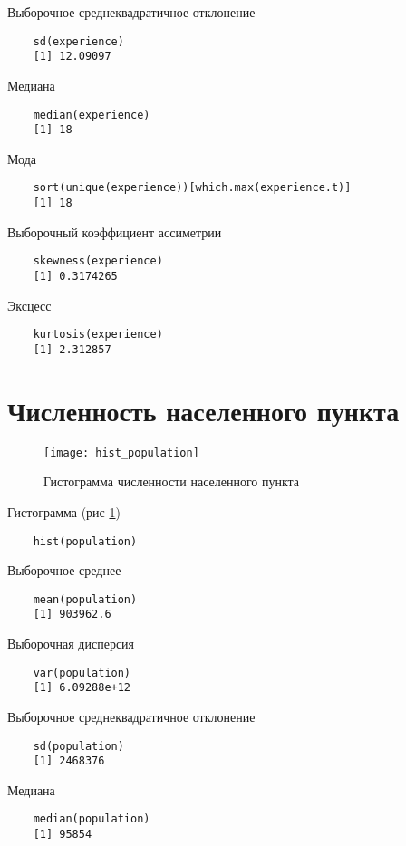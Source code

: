 \documentclass[12pt,a4paper,titlepage]{article}
\begin{document}
  Выборочное среднеквадратичное отклонение
  \begin{lstlisting}
    sd(experience)
    [1] 12.09097
  \end{lstlisting}

  Медиана
  \begin{lstlisting}
    median(experience)
    [1] 18
  \end{lstlisting}

  Мода
  \begin{lstlisting}
    sort(unique(experience))[which.max(experience.t)]
    [1] 18
  \end{lstlisting}

  Выборочный коэффициент ассиметрии
  \begin{lstlisting}
    skewness(experience)
    [1] 0.3174265
  \end{lstlisting}

  Эксцесс
  \begin{lstlisting}
    kurtosis(experience)
    [1] 2.312857
  \end{lstlisting}

\section{Численность населенного пункта}
  \begin{figure}
    \texttt{[image: hist\_population]}
    \caption{Гистограмма численности населенного пункта}
    \label{population_hist}
  \end{figure}

  Гистограмма (рис \ref{population_hist})
  \begin{lstlisting}
    hist(population)
  \end{lstlisting}

  Выборочное среднее
  \begin{lstlisting}
    mean(population)
    [1] 903962.6
  \end{lstlisting}

  Выборочная дисперсия
  \begin{lstlisting}
    var(population)
    [1] 6.09288e+12
  \end{lstlisting}

  Выборочное среднеквадратичное отклонение
  \begin{lstlisting}
    sd(population)
    [1] 2468376
  \end{lstlisting}

  Медиана
  \begin{lstlisting}
    median(population)
    [1] 95854
  \end{lstlisting}
\end{document}
